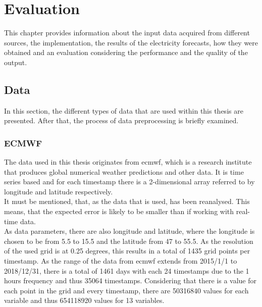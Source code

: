 \chapter{Evaluation}
\label{ch:Evaluation}

This chapter provides information about the input data acquired from different sources, the implementation, the results of the electricity forecasts, how they were obtained and an evaluation considering the performance and the quality of the output.\\


\section{Data}
\label{sec:data}

In this section, the different types of data that are used within this thesis are presented. After that, the process of data preprocessing is briefly examined.\\



\subsection*{ECMWF}

The data used in this thesis originates from \gls{ecmwf}, which is a research institute that produces global numerical weather predictions and other data. It is time series based and for each timestamp there is a 2-dimensional array referred to by longitude and latitude respectively.\\

It must be mentioned, that, as the data that is used, has been reanalysed. This means, that the expected error is likely to be smaller than if working with real-time data.\\

As data parameters, there are also longitude and latitude, where the longitude is chosen to be from 5.5 to 15.5 and the latitude from 47 to 55.5. As the resolution of the used grid is at 0.25 degrees, this results in a total of 1435 grid points per timestamp. As the range of the data from \gls{ecmwf} extends from 2015/1/1 to 2018/12/31, there is a total of 1461 days with each 24 timestamps due to the 1 hours frequency and thus 35064 timestamps. Considering that there is a value for each point in the grid and every timestamp, there are 50316840 values for each variable and thus 654118920 values for 13 variables.\\

